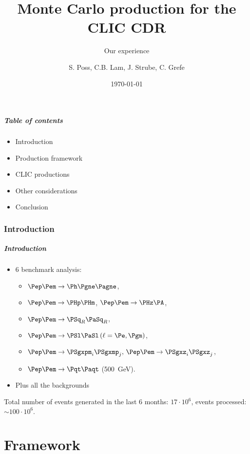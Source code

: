 \documentclass{beamer}
\author{S. Poss, C.B. Lam, J. Strube, C. Grefe}
\institute[CERN]{CERN}
\title[]{Monte Carlo production for the CLIC CDR}
\subtitle{Our experience}
\date{\today}
\begin{document}
\begin{frame}
	\titlepage
\end{frame}

\begin{frame}
	\frametitle{Table of contents}
	\begin{itemize}
\item Introduction
\item Production framework
\item CLIC productions
\item Other considerations
\item Conclusion
\end{itemize}
\end{frame}

\section{Introduction}

\begin{frame}
	\frametitle{Introduction}
\begin{itemize}
\item 6 benchmark analysis: 
\begin{itemize}
\item $\Pep\Pem \to \Ph \Pgne \Pagne$,
\item  $\Pep\Pem \to \PHp \PHm$, $\Pep\Pem \to \PHz \PA$, 
\item $\Pep\Pem \to \PSq_R \PaSq_R$, 
\item $\Pep\Pem \to \PSl \PaSl \,(\ell = \Pe,\Pgm)$, 
\item $\Pep\Pem \to \PSgxpm_i \PSgxmp_j,\, \Pep\Pem \to \PSgxz_i \PSgxz_j$,
\item  $\Pep\Pem \to \Pqt \Paqt$ (500~GeV).
\end{itemize}
\item Plus all the backgrounds
\end{itemize}
Total number of events generated in the last 6 months: \alert{$17\cdot 10^6$}, events processed: $\sim 100\cdot 10^6$.
\end{frame}

\part{Framework}
\begin{frame}
\partpage 
\end{frame}
\end{document}
